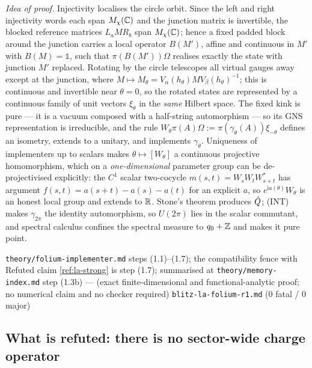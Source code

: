 \emph{Idea of proof.} Injectivity localises the circle orbit. Since the left
and right injectivity words each span $M_\chi(\mathbb{C})$ and the junction matrix is
invertible, the blocked reference matrices $L_aMR_b$ span $M_\chi(\mathbb{C})$; hence
a fixed padded block around the junction carries a local operator $B(M')$,
affine and continuous in $M'$ with $B(M)=\mathbb{1}$, such that
$\pi(B(M'))\Omega$ realises exactly the state with junction $M'$ replaced.
Rotating by the circle telescopes all virtual gauges away except at the
junction, where $M\mapsto M_\theta=V_\alpha(h_\theta)MV_\beta(h_\theta)^{-1}$;
this is continuous and invertible near $\theta=0$, so the rotated states are
represented by a continuous family of unit vectors $\xi_\theta$ in the
\emph{same} Hilbert space. The fixed kink is pure --- it is a vacuum composed
with a half-string automorphism --- so its GNS representation is irreducible,
and the rule
$W_\theta\pi(A)\Omega:=\pi(\gamma_\theta(A))\xi_{-\theta}$ defines an
isometry, extends to a unitary, and implements $\gamma_\theta$. Uniqueness of
implementers up to scalars makes $\theta\mapsto[W_\theta]$ a continuous
projective homomorphism, which on a \emph{one-dimensional} parameter group can
be de-projectivised explicitly: the $C^1$ scalar two-cocycle
$m(s,t)=W_sW_tW_{s+t}^{*}$ has argument $f(s,t)=a(s+t)-a(s)-a(t)$ for an
explicit $a$, so $e^{\mathrm{i}a(\theta)}W_\theta$ is an honest local group
and extends to $\mathbb{R}$. Stone's theorem produces $\hat{Q}$; (INT) makes
$\gamma_{2\pi}$ the identity automorphism, so $U(2\pi)$ lies in the scalar
commutant, and spectral calculus confines the spectral measure to
$q_0+\mathbb{Z}$ and makes it pure point.

{\texttt{theory/folium-implementer.md} steps (1.1)--(1.7); the compatibility
 fence with Refuted claim \ref{ref:la-strong} is step (1.7); summarised at
 \texttt{theory/memory-index.md} step (1.3b)}
{--- (exact finite-dimensional and functional-analytic proof; no numerical
 claim and no checker required)}
{\texttt{blitz-la-folium-r1.md} (0 fatal / 0 major)}

\subsection{What is refuted: there is no sector-wide charge operator}

